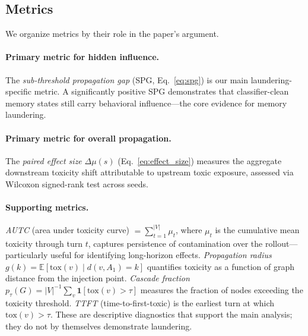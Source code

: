 \subsection{Metrics}
\label{subsec:metrics}

We organize metrics by their role in the paper's argument.

\paragraph{Primary metric for hidden influence.}
The \emph{sub-threshold propagation gap} (SPG, Eq.~\eqref{eq:spg}) is our main laundering-specific metric.
A significantly positive SPG demonstrates that classifier-clean memory states still carry behavioral influence---the core evidence for memory laundering.

\paragraph{Primary metric for overall propagation.}
The \emph{paired effect size} $\Delta\mu(s)$ (Eq.~\eqref{eq:effect_size}) measures the aggregate downstream toxicity shift attributable to upstream toxic exposure, assessed via Wilcoxon signed-rank test across seeds.

\paragraph{Supporting metrics.}
\emph{AUTC} (area under toxicity curve) $= \sum_{t=1}^{|V|} \mu_t$, where $\mu_t$ is the cumulative mean toxicity through turn $t$, captures persistence of contamination over the rollout---particularly useful for identifying long-horizon effects.
\emph{Propagation radius} $g(k) = \mathbb{E}[\mathrm{tox}(v) \mid d(v, A_1) = k]$ quantifies toxicity as a function of graph distance from the injection point.
\emph{Cascade fraction} $p_\tau(G) = |V|^{-1} \sum_v \mathbf{1}[\mathrm{tox}(v) > \tau]$ measures the fraction of nodes exceeding the toxicity threshold.
\emph{TTFT} (time-to-first-toxic) is the earliest turn at which $\mathrm{tox}(v) > \tau$.
These are descriptive diagnostics that support the main analysis; they do not by themselves demonstrate laundering.



